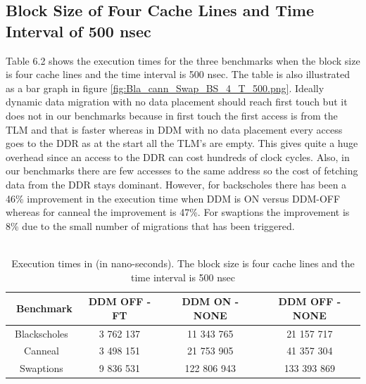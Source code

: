 \documentclass{listhesis}
\begin{document}
\subsection{Block Size of Four Cache Lines and Time Interval of 500 nsec}
Table 6.2 shows the execution times for the three benchmarks when the block size is four cache lines and the time interval is 500 nsec. The table is also illustrated as a bar graph in figure \ref{fig:Bla_cann_Swap_BS_4_T_500.png}. Ideally dynamic data migration with no data placement should reach first touch but it does not in our benchmarks because in first touch the first access is from the TLM and that is faster whereas in DDM with no data placement every access goes to the DDR as at the start all the TLM's are empty. This gives quite a huge overhead since an access to the DDR can cost hundreds of clock cycles. Also, in our benchmarks there are few accesses to the same address so the cost of fetching data from the DDR stays dominant. However, for backscholes there has been a 46\% improvement in the execution time when DDM is ON versus DDM-OFF whereas for canneal the improvement is 47\%. For swaptions the improvement is 8\% due to the small number of migrations that has been triggered.\\
\\
\begin{table}[h!]
\begin{center}
 \begin{tabular}{|| c | c | c | c||} 
 \hline
 \ \textbf{Benchmark} & \textbf{DDM OFF - FT}  & \textbf{DDM ON - NONE}  & \textbf{DDM OFF - NONE}\\ [0.5 ex] 
 \hline\hline
  Blackscholes   &   3 762 137   &   11 343 765	    &  21 157 717 \\ 
 \hline
   Canneal  	&   3 498 151    &   21 753 905   	&   41 357 304   \\
 \hline
    Swaptions   &   9 836 531     &   122 806 943 	&   133 393 869   \\
 \hline
\end{tabular}
 \caption{Execution times in (in nano-seconds). The block size is four cache lines and the time interval is 500 nsec}
 \label{table:ExecTimes2}
\end{center}
\end{table}
\end{document}

